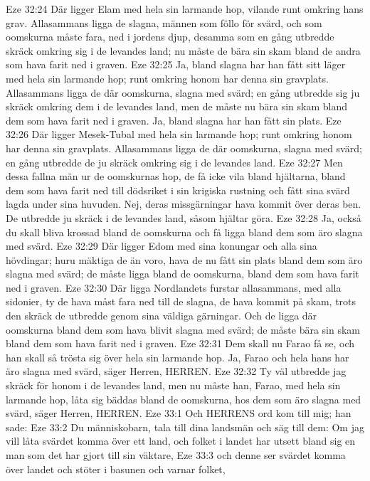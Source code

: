 Eze 32:24  Där ligger Elam med hela sin larmande hop, vilande runt omkring hans grav. Allasammans ligga de slagna, männen som föllo för svärd, och som oomskurna måste fara, ned i jordens djup, desamma som en gång utbredde skräck omkring sig i de levandes land; nu måste de bära sin skam bland de andra som hava farit ned i graven.
Eze 32:25  Ja, bland slagna har han fått sitt läger med hela sin larmande hop; runt omkring honom har denna sin gravplats. Allasammans ligga de där oomskurna, slagna med svärd; en gång utbredde sig ju skräck omkring dem i de levandes land, men de måste nu bära sin skam bland dem som hava farit ned i graven. Ja, bland slagna har han fått sin plats.
Eze 32:26  Där ligger Mesek-Tubal med hela sin larmande hop; runt omkring honom har denna sin gravplats. Allasammans ligga de där oomskurna, slagna med svärd; en gång utbredde de ju skräck omkring sig i de levandes land.
Eze 32:27  Men dessa fallna män ur de oomskurnas hop, de få icke vila bland hjältarna, bland dem som hava farit ned till dödsriket i sin krigiska rustning och fått sina svärd lagda under sina huvuden. Nej, deras missgärningar hava kommit över deras ben. De utbredde ju skräck i de levandes land, såsom hjältar göra.
Eze 32:28  Ja, också du skall bliva krossad bland de oomskurna och få ligga bland dem som äro slagna med svärd.
Eze 32:29  Där ligger Edom med sina konungar och alla sina hövdingar; huru mäktiga de än voro, hava de nu fått sin plats bland dem som äro slagna med svärd; de måste ligga bland de oomskurna, bland dem som hava farit ned i graven.
Eze 32:30  Där ligga Nordlandets furstar allasammans, med alla sidonier, ty de hava måst fara ned till de slagna, de hava kommit på skam, trots den skräck de utbredde genom sina väldiga gärningar. Och de ligga där oomskurna bland dem som hava blivit slagna med svärd; de måste bära sin skam bland dem som hava farit ned i graven.
Eze 32:31  Dem skall nu Farao få se, och han skall så trösta sig över hela sin larmande hop. Ja, Farao och hela hans har äro slagna med svärd, säger Herren, HERREN.
Eze 32:32  Ty väl utbredde jag skräck för honom i de levandes land, men nu måste han, Farao, med hela sin larmande hop, låta sig bäddas bland de oomskurna, hos dem som äro slagna med svärd, säger Herren, HERREN.
Eze 33:1  Och HERRENS ord kom till mig; han sade:
Eze 33:2  Du människobarn, tala till dina landsmän och säg till dem: Om jag vill låta svärdet komma över ett land, och folket i landet har utsett bland sig en man som det har gjort till sin väktare,
Eze 33:3  och denne ser svärdet komma över landet och stöter i basunen och varnar folket,
